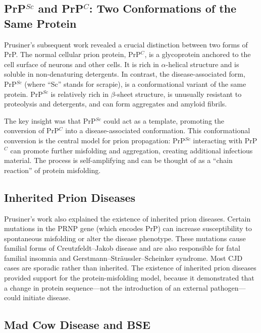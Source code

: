 \subsection{PrP\texorpdfstring{$^{Sc}$}{Sc} and PrP\texorpdfstring{$^{C}$}{C}: Two Conformations of the Same Protein}

Prusiner's subsequent work revealed a crucial distinction between two forms of PrP. The normal cellular prion protein, PrP$^{C}$, is a glycoprotein anchored to the cell surface of neurons and other cells. It is rich in $\alpha$-helical structure and is soluble in non-denaturing detergents. In contrast, the disease-associated form, PrP$^{Sc}$ (where ``Sc'' stands for scrapie), is a conformational variant of the same protein. PrP$^{Sc}$ is relatively rich in $\beta$-sheet structure, is unusually resistant to proteolysis and detergents, and can form aggregates and amyloid fibrils.

The key insight was that PrP$^{Sc}$ could act as a template, promoting the conversion of PrP$^{C}$ into a disease-associated conformation. This conformational conversion is the central model for prion propagation: PrP$^{Sc}$ interacting with PrP$^{C}$ can promote further misfolding and aggregation, creating additional infectious material. The process is self-amplifying and can be thought of as a ``chain reaction'' of protein misfolding.

\subsection{Inherited Prion Diseases}

Prusiner's work also explained the existence of inherited prion diseases. Certain mutations in the PRNP gene (which encodes PrP) can increase susceptibility to spontaneous misfolding or alter the disease phenotype. These mutations cause familial forms of Creutzfeldt--Jakob disease and are also responsible for fatal familial insomnia and Gerstmann--Str{\"a}ussler--Scheinker syndrome. Most CJD cases are sporadic rather than inherited. The existence of inherited prion diseases provided support for the protein-misfolding model, because it demonstrated that a change in protein sequence---not the introduction of an external pathogen---could initiate disease.

\subsection{Mad Cow Disease and BSE}

